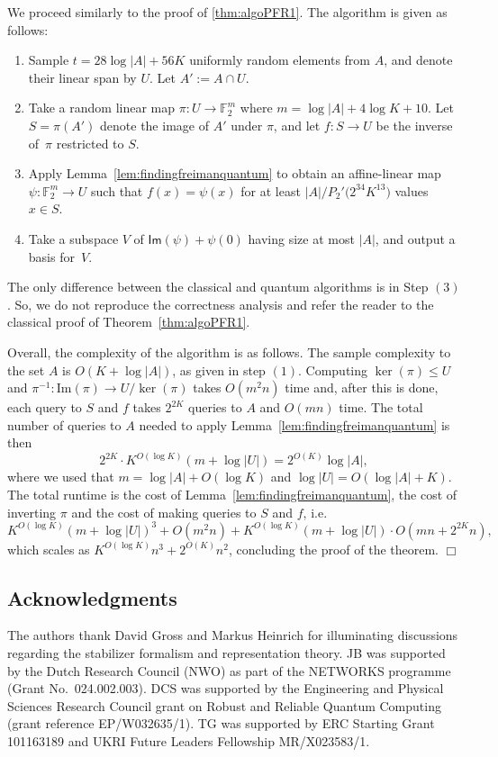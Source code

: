 \documentclass[11pt]{amsart}
\theoremstyle{plain}
\theoremstyle{definition}
\theoremstyle{remark}
\renewenvironment{proof}[1][]{
    	\begin{trivlist}
     	\item[\hspace{\labelsep}{\em\noindent Proof#1:\/}]}
     	{{\hfill$\Box$}
    	\end{trivlist}
  }
\begin{document}
\begin{proof}[ of Theorem~\ref{thm:algoquantumPFR1}]
We proceed similarly to the proof of \cref{thm:algoPFR1}.
The algorithm is given as follows:
\begin{enumerate}
    \item Sample $t = 28 \log|A| + 56K$ uniformly random elements from $A$, and denote their linear span by $U$.
    Let $A' := A\cap U$.
    \item Take a random linear map $\pi: U \to \mathbb{F}_2^m$ where $m = \log|A| + 4\log K + 10$. Let $S = \pi(A')$ denote the image of $A'$ under $\pi$, and let $f: S \to U$ be the inverse of~$\pi$ restricted to $S$.
    \item Apply Lemma~\ref{lem:findingfreimanquantum} to obtain an affine-linear map $\psi: \mathbb{F}_2^m \to U$ such that $f(x) = \psi(x)$ for at least $|A|/P_2'\big(2^{34}K^{13}\big)$ values $x \in S$.
    \item Take a subspace $V$ of $\textsf{Im}(\psi) + \psi(0)$ having size at most $|A|$, and output a basis for~$V$.
\end{enumerate}
The only difference between the classical and quantum algorithms is in Step $(3)$.  So, we do not reproduce the correctness analysis and refer the reader to the classical proof of Theorem~\ref{thm:algoPFR1}.

Overall, the complexity of the algorithm is as follows.
The sample complexity to the set $A$ is $O(K+\log |A|)$, as given in step $(1)$.
Computing $\ker(\pi) \leq U$ and $\pi^{-1}: \mathrm{Im}(\pi) \to U/\ker(\pi)$ takes $O(m^2n)$ time and, after this is done, each query to $S$ and $f$ takes $2^{2K}$ queries to $A$ and $O(mn)$ time.
The total number of queries to $A$ needed to apply Lemma~\ref{lem:findingfreimanquantum} is then
$$2^{2K} \cdot K^{O(\log K)} (m+\log|U|) = 2^{O(K)} \log |A|,$$
where we used that $m = \log |A| + O(\log K)$ and $\log|U| = O(\log|A| + K)$.
The total runtime is the cost of Lemma~\ref{lem:findingfreimanquantum}, the cost of inverting $\pi$ and the cost of making queries to $S$ and $f$, i.e.
$$K^{O(\log K)}(m+\log|U|)^3 + O(m^2 n) + K^{O(\log K)} (m+\log|U|) \cdot O(mn + 2^{2K}n),$$
which scales as $K^{O(\log K)} n^3 + 2^{O(K)}n^2$, concluding the proof of the theorem.
\end{proof}


\subsection*{Acknowledgments}

The authors thank David Gross and Markus Heinrich for illuminating discussions regarding the stabilizer formalism and representation theory.
JB was supported by the Dutch Research Council (NWO) as part of the NETWORKS programme (Grant No.~024.002.003).
DCS was supported by the Engineering and Physical Sciences Research Council grant on Robust and Reliable Quantum Computing (grant reference EP/W032635/1). TG was supported by ERC Starting Grant 101163189 and UKRI Future Leaders Fellowship MR/X023583/1.




\end{document}
